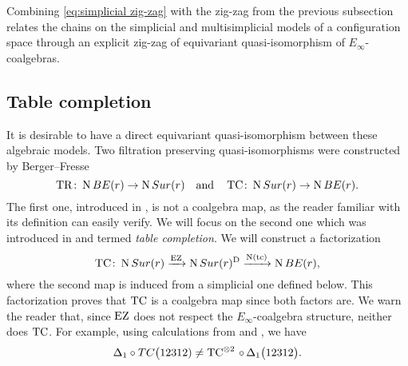 Combining \eqref{eq:simplicial zig-zag} with the zig-zag from the previous subsection relates the chains on the simplicial and multisimplicial models of a configuration space through an explicit zig-zag of equivariant quasi-isomorphism of $E_\infty$-coalgebras.

\subsection{Table completion}\label{ss:table completion}

It is desirable to have a direct equivariant quasi-isomorphism between these algebraic models.
Two filtration preserving quasi-isomorphisms were constructed by Berger--Fresse
\[
\operatorname{TR} \colon \operatorname{N}BE(r) \to \operatorname{N}Sur(r)
\quad \text{and} \quad
\operatorname{TC} \colon \operatorname{N}Sur(r) \to \operatorname{N} BE(r).
\]
The first one, introduced in \cite[1$\cdot$3]{berger2004combinatorial}, is not a coalgebra map, as the reader familiar with its definition can easily verify.
We will focus on the second one which was introduced in \cite{berger2002prismatic} and termed \textit{table completion}.
We will construct a factorization
\[
\operatorname{TC} \colon \operatorname{N}Sur(r) \xrightarrow{\operatorname{EZ}} \operatorname{N}Sur(r)^{\mathrm{D}} \xrightarrow{\operatorname{N}(\operatorname{tc})} \operatorname{N} BE(r),
\]
where the second map is induced from a simplicial one defined below.
This factorization proves that $\operatorname{TC}$ is a coalgebra map since both factors are.
We warn the reader that, since $\operatorname{EZ}$ does not respect the $E_\infty$-coalgebra structure,
neither does $\operatorname{TC}$.
For example, using calculations from \cite{medina2022cube_einfty} and \cite{berger2002prismatic}, we have
\[
\Delta_1 \circ TC\big(12312) \neq
\operatorname{TC} ^{\otimes 2}\, \circ \, \Delta_1\big(12312\big).
\]

%

